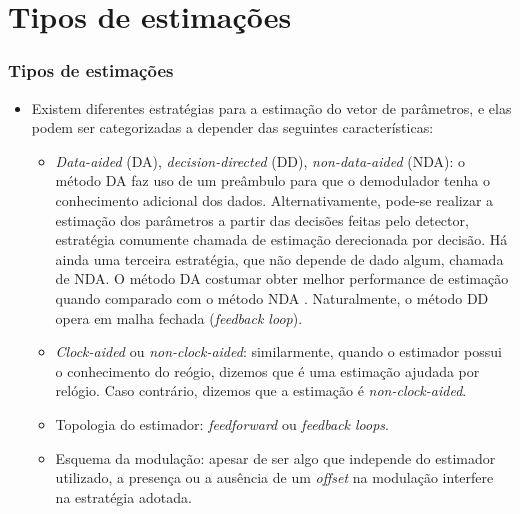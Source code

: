 \section{Tipos de estimações}
\begin{frame}[t]
	\frametitle{Tipos de estimações}
	\begin{itemize}
		\item Existem diferentes estratégias para a estimação do vetor de parâmetros, e elas podem ser categorizadas a depender das seguintes características:
		\begin{itemize}
            \item \textit{Data-aided} (DA), \textit{decision-directed} (DD), \textit{non-data-aided} (NDA): o método DA faz uso de um preâmbulo para que o demodulador tenha o conhecimento adicional dos dados. Alternativamente, pode-se realizar a estimação dos parâmetros a partir das decisões feitas pelo detector, estratégia comumente chamada de estimação derecionada por decisão. Há ainda uma terceira estratégia, que não depende de dado algum, chamada de NDA. O método DA costumar obter melhor performance de estimação quando comparado com o método NDA \cite{mengali2013synchronization}. Naturalmente, o método DD opera em malha fechada (\textit{feedback loop}).
            \item \textit{Clock-aided} ou \textit{non-clock-aided}: similarmente, quando o estimador possui o conhecimento do reógio, dizemos que é uma estimação ajudada por relógio. Caso contrário, dizemos que a estimação é \textit{non-clock-aided}.
            \item Topologia do estimador: \textit{feedforward} ou \textit{feedback loops}.
            \item Esquema da modulação: apesar de ser algo que independe do estimador utilizado, a presença ou a ausência de um \textit{offset} na modulação interfere na estratégia adotada.
        \end{itemize}
	\end{itemize}
	
\end{frame}

